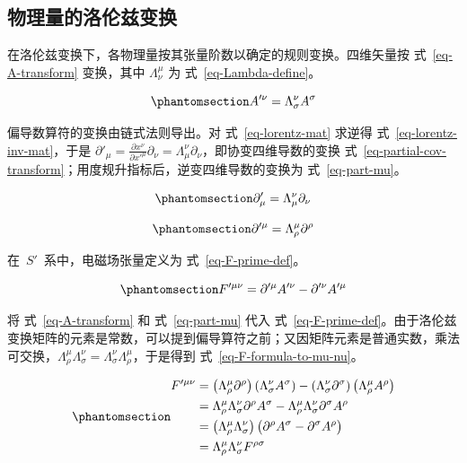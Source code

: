 \documentclass[
  chinese,
  a4paper,
  UTF8,
  12pt,
  oneside,
  openany]{ctexbook}
\theoremstyle{plain}
\theoremstyle{plain}
\theoremstyle{plain}
\theoremstyle{definition}
\theoremstyle{plain}
\theoremstyle{plain}
\theoremstyle{remark}
\begin{document}
\subsection{物理量的洛伦兹变换}\label{ux7269ux7406ux91cfux7684ux6d1bux4f26ux5179ux53d8ux6362}

在洛伦兹变换下，各物理量按其张量阶数以确定的规则变换。四维矢量按
式~\ref{eq-A-transform} 变换，其中 \(\Lambda_{\nu}^{\mu}\) 为
式~\ref{eq-Lambda-define}。

\begin{equation}\protect\phantomsection\label{eq-A-transform}{
A'^{\nu} = \Lambda_{\sigma}^{\nu}A^{\sigma}
}\end{equation}

偏导数算符的变换由链式法则导出。对 式~\ref{eq-lorentz-mat} 求逆得
式~\ref{eq-lorentz-inv-mat}，于是
\(\partial'_{\mu} = \frac{\partial x^{\nu}}{\partial x'^{\mu}}\partial_{\nu} = \Lambda_{\mu}^{\nu}\partial_{\nu}\)，即协变四维导数的变换
式~\ref{eq-partial-cov-transform}；用度规升指标后，逆变四维导数的变换为
式~\ref{eq-part-mu}。

\begin{equation}\protect\phantomsection\label{eq-partial-cov-transform}{
\partial'_{\mu} = \Lambda_{\mu}^{\nu}\partial_{\nu}
}\end{equation}

\begin{equation}\protect\phantomsection\label{eq-part-mu}{
\partial'^{\mu} = \Lambda_{\rho}^{\mu}\partial^{\rho}
}\end{equation}

在~\(S'\)~系中，电磁场张量定义为 式~\ref{eq-F-prime-def}。

\begin{equation}\protect\phantomsection\label{eq-F-prime-def}{
F'^{\mu\nu} = \partial'^{\mu}A'^{\nu} - \partial'^{\nu}A'^{\mu}
}\end{equation}

将 式~\ref{eq-A-transform} 和 式~\ref{eq-part-mu} 代入
式~\ref{eq-F-prime-def}。由于洛伦兹变换矩阵的元素是常数，可以提到偏导算符之前；又因矩阵元素是普通实数，乘法可交换，\(\Lambda_{\rho}^{\mu}\Lambda_{\sigma}^{\nu} = \Lambda_{\sigma}^{\nu}\Lambda_{\rho}^{\mu}\)，于是得到
式~\ref{eq-F-formula-to-mu-nu}。

\begin{equation}\protect\phantomsection\label{eq-F-formula-to-mu-nu}{
\begin{aligned}
F'^{\mu\nu}
&= \left(\Lambda_{\rho}^{\mu}\partial^{\rho} \right)\left(\Lambda_{\sigma}^{\nu}A^{\sigma} \right)
- \left(\Lambda_{\sigma}^{\nu}\partial^{\sigma} \right)\left(\Lambda_{\rho}^{\mu}A^{\rho} \right) \\
&= \Lambda_{\rho}^{\mu}\Lambda_{\sigma}^{\nu}\partial^{\rho}A^{\sigma}
- \Lambda_{\rho}^{\mu}\Lambda_{\sigma}^{\nu}\partial^{\sigma}A^{\rho} \\
&= \left(\Lambda_{\rho}^{\mu}\Lambda_{\sigma}^{\nu} \right)
\bigl(\partial^{\rho}A^{\sigma} - \partial^{\sigma}A^{\rho} \bigr) \\
&= \Lambda_{\rho}^{\mu}\Lambda_{\sigma}^{\nu}F^{\rho\sigma}
\end{aligned}
}\end{equation}
\end{document}

